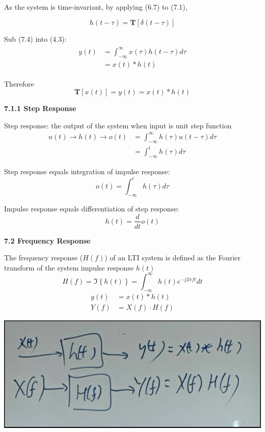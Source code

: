 \documentclass[landscape,a4paper]{extarticle}
\newenvironment{Figure}
  {\par\medskip\noindent\minipage{\linewidth}}
  {\endminipage\par\medskip}
\newcommand{\T}{\textbf{T}}
\newcommand{\fourier}[1]{\Im\left\{#1\right\}}
\begin{document}
\begin{multicols*}{5}
    As the system is time-invariant, by applying (6.7) to (7.1),

    \[
        h(t-\tau) = \T\left[\delta(t-\tau)\right] \tag{7.4}
    \]

    Sub (7.4) into (4.3):
    \begin{align*}
        \begin{split}
            y(t) &= \int_{-\infty}^{\infty}x(\tau)h(t-\tau) d\tau\\
            &= x(t) * h(t)
        \end{split} 
        \tag{7.5}
    \end{align*}

    Therefore
    \[
        \T[x(t)] = y(t) = x(t) * h(t)
    \]

    \textbf{7.1.1 Step Response}

    Step response: the output of the system when input is unit step function
    \begin{align*}
        u(t) \rightarrow h(t) \rightarrow o(t) &= \int_{-\infty}^{\infty}h(\tau) u(t-\tau) d \tau\\
        &= \int_{-\infty}^{t}h(\tau) d \tau
    \end{align*}

    Step response equals integration of impulse response:
    \[
        o(t) = \int_{-\infty}^{t}h(\tau) d\tau
    \]

    Impulse response equals differentiation of step response:
    \[
        h(t) = \frac{d}{dt} o(t)
    \]

    \textbf{7.2 Frequency Response}

    The frequency response ($H(f)$) of an LTI system is defined as the Fourier transform of the system impulse response $h(t)$
    \[
        H(f) = \fourier{h(t)} = \int_{-\infty}^{\infty} h(t) e^{-j2\pi ft} dt \tag{7.6}
    \]
    \begin{align*}
        y(t) &= x(t) * h(t)\\
        Y(f) &= X(f) \cdot H(f) \tag{7.7}
    \end{align*}

    \begin{Figure}
        \centering
        \includegraphics[width=0.6\linewidth]{LTI_hf_ht.jpg}
    \end{Figure}


\end{multicols*}
\end{document}
